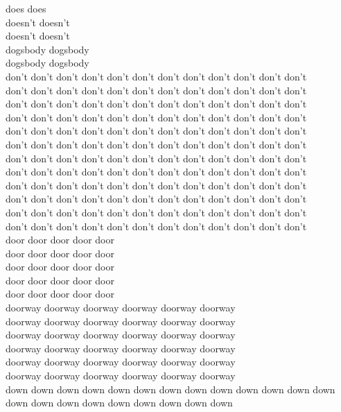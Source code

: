 does does\\
doesn't doesn't\\
doesn't doesn't\\
dogsbody dogsbody\\
dogsbody dogsbody\\
don't don't don't don't don't don't don't don't don't don't don't don't\\
don't don't don't don't don't don't don't don't don't don't don't don't\\
don't don't don't don't don't don't don't don't don't don't don't don't\\
don't don't don't don't don't don't don't don't don't don't don't don't\\
don't don't don't don't don't don't don't don't don't don't don't don't\\
don't don't don't don't don't don't don't don't don't don't don't don't\\
don't don't don't don't don't don't don't don't don't don't don't don't\\
don't don't don't don't don't don't don't don't don't don't don't don't\\
don't don't don't don't don't don't don't don't don't don't don't don't\\
don't don't don't don't don't don't don't don't don't don't don't don't\\
don't don't don't don't don't don't don't don't don't don't don't don't\\
don't don't don't don't don't don't don't don't don't don't don't don't\\
door door door door door\\
door door door door door\\
door door door door door\\
door door door door door\\
door door door door door\\
doorway doorway doorway doorway doorway doorway\\
doorway doorway doorway doorway doorway doorway\\
doorway doorway doorway doorway doorway doorway\\
doorway doorway doorway doorway doorway doorway\\
doorway doorway doorway doorway doorway doorway\\
doorway doorway doorway doorway doorway doorway\\
down down down down down down down down down down down down down down down down down down down down down down\\
